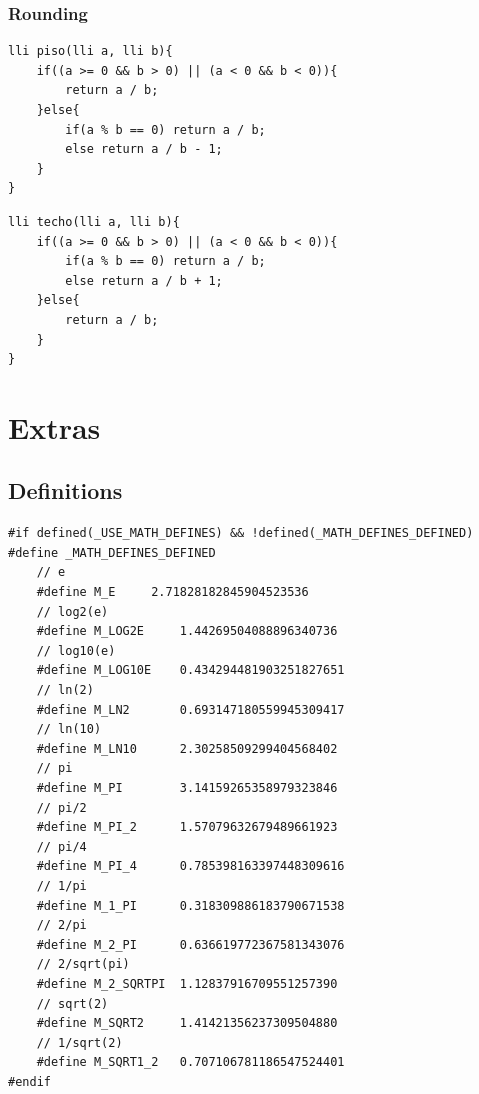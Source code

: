 \documentclass[twoside]{article}
\begin{document}
\begin{multicols*}{2}
\begin{verbatim}
\end{verbatim}

\subsubsectionfont{\large\bfseries\sffamily\underline}
\subsubsection*{Rounding}
\begin{verbatim}
lli piso(lli a, lli b){
	if((a >= 0 && b > 0) || (a < 0 && b < 0)){
		return a / b;
	}else{
		if(a % b == 0) return a / b;
		else return a / b - 1;
	}
}

\end{verbatim}
\vspace{-12pt}
\begin{verbatim}
lli techo(lli a, lli b){
	if((a >= 0 && b > 0) || (a < 0 && b < 0)){
		if(a % b == 0) return a / b;
		else return a / b + 1;
	}else{
		return a / b;
	}
}

\end{verbatim}

\sectionfont{\bfseries\sffamily\centering\Huge}
\vspace{1em}
\section*{Extras}
\vspace{3em}
\subsectionfont{\large\bfseries\sffamily\underline}
\subsection*{Definitions}
\begin{verbatim}
#if defined(_USE_MATH_DEFINES) && !defined(_MATH_DEFINES_DEFINED)
#define _MATH_DEFINES_DEFINED
	// e
	#define M_E		2.71828182845904523536
	// log2(e)
	#define M_LOG2E		1.44269504088896340736
	// log10(e)
	#define M_LOG10E	0.434294481903251827651
	// ln(2)
	#define M_LN2		0.693147180559945309417
	// ln(10)
	#define M_LN10		2.30258509299404568402
	// pi
	#define M_PI		3.14159265358979323846
	// pi/2
	#define M_PI_2		1.57079632679489661923
	// pi/4
	#define M_PI_4		0.785398163397448309616
	// 1/pi
	#define M_1_PI	 	0.318309886183790671538
	// 2/pi
	#define M_2_PI		0.636619772367581343076
	// 2/sqrt(pi)
	#define M_2_SQRTPI	1.12837916709551257390
	// sqrt(2)
	#define M_SQRT2		1.41421356237309504880
	// 1/sqrt(2)
	#define M_SQRT1_2	0.707106781186547524401
#endif



\end{verbatim}
\end{multicols*}
\end{document}
